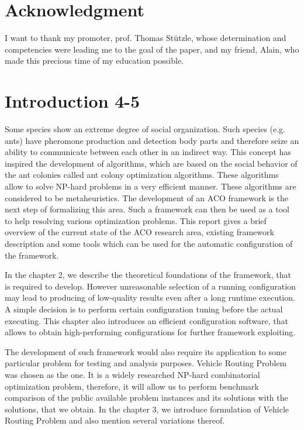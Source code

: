 \documentclass[11pt,a4paper,oneside]{book}
\begin{document}
\chapter*{Acknowledgment}
\thispagestyle{empty} 

\noindent I want to thank my promoter, prof. Thomas St{\"u}tzle, whose determination and competencies were leading me to the goal of the paper, and my friend, Alain, who made this precious time of my education possible.

\thispagestyle{empty} 
\setcounter{page}{0}
\tableofcontents
\mainmatter 
\chapter{Introduction 4-5}
\setcounter{page}{1}
\vspace*{0.5cm}

Some species show an extreme degree of social organization. Such species (e.g. ants) have pheromone production and detection body parts and therefore seize an ability to communicate between each other in an indirect way. This concept has inspired the development of algorithms, which are based on the social behavior of the ant colonies called ant colony optimization algorithms. These algorithms allow to solve NP-hard problems in a very efficient manner. These algorithms are considered to be metaheuristics. The development of an ACO framework is the next step of formalizing this area. Such a framework can then be used as a tool to help resolving various optimization problems. This report gives a brief overview of the current state of the ACO research area, existing framework description and some tools which can be used for the automatic configuration of the framework.


In the chapter 2, we describe the theoretical foundations of the framework, that is required to develop. However unreasonable selection of a running configuration may lead to producing of low-quality results even after a long runtime execution. A simple decision is to perform certain configuration tuning before the actual executing. This chapter also introduces an efficient configuration software, that allows to obtain high-performing configurations for further framework exploiting.

The development of such framework would also require its application to some particular problem for testing and analysis purposes. Vehicle Routing Problem was chosen as the one. It is a widely researched NP-hard combinatorial optimization problem, therefore, it will allow us to perform benchmark comparison of the public available problem instances and its solutions with the solutions, that we obtain. In the chapter 3, we introduce formulation of Vehicle Routing Problem and also mention several variations thereof.
\end{document}
